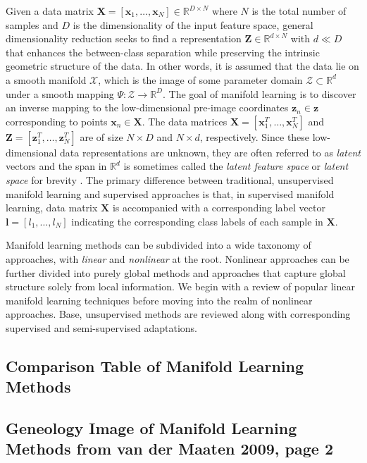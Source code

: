Given a data matrix $\bm{X} = [\bm{x}_1, \dots, \bm{x}_N]\in \mathbb{R}^{D \times N}$ where $N$ is the total number of samples and $D$ is the dimensionality of the input feature space, general dimensionality reduction seeks to find a representation $\bm{Z} \in \mathbb{R}^{d \times N}$ with $d \ll D$ that enhances the between-class separation while preserving the intrinsic geometric structure of the data\citep{Vural2018StudySupervisedManifoldLearning}.  In other words, it is assumed that the data lie on a smooth manifold $\mathcal{X}$, which is the image of some parameter domain $\mathcal{Z} \subset \mathbb{R}^{d}$ under a smooth mapping $\Psi : \mathcal{Z} \rightarrow \mathbb{R}^{D}$.  The goal of manifold learning is to discover an inverse mapping to the low-dimensional pre-image coordinates $\bm{z}_n \in \bm{z}$ corresponding to points $\bm{x}_n \in \bm{X}$.  The data matrices $\bm{X} = [\bm{x}^{T}_{1}, \dots, \bm{x}^{T}_{N}]$ and $\bm{Z} = [\bm{z}^{T}_{1}, \dots, \bm{z}^{T}_{N}]$ are of size $N \times D$ and $N \times d$, respectively.  Since these low-dimensional data representations are unknown, they are often referred to as \textit{latent} vectors and the span in $\mathbb{R}^d$ is sometimes called the \textit{latent feature space} or \textit{latent space} for brevity \citep{Murphy2012}. The primary difference between traditional, unsupervised manifold learning and supervised approaches is that, in supervised manifold learning, data matrix $\bm{X} $ is accompanied with a corresponding label vector $\bm{l} = [l_1, \dots, l_N]$ indicating the corresponding class labels of each sample in $\bm{X}$. \newline

Manifold learning methods can be subdivided into a wide taxonomy of approaches, with \textit{linear} and \textit{nonlinear} at the root. Nonlinear approaches can be further divided into purely global methods and approaches that capture global structure solely from local information.  We begin with a review of popular linear manifold learning techniques before moving into the realm of nonlinear approaches. Base, unsupervised methods are reviewed along with corresponding supervised and semi-supervised adaptations. 

\subsection{Comparison Table of Manifold Learning Methods}
\subsection{Geneology Image of Manifold Learning Methods from van der Maaten 2009, page  2}

